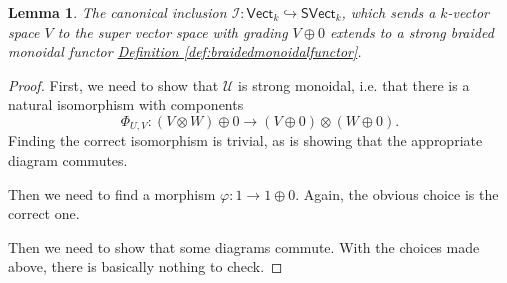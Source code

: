 \documentclass[a4paper,10pt]{scrreprt}
\theoremstyle{definition}
\theoremstyle{plain}
\newtheorem{lemma}{Lemma}[section]
\theoremstyle{remark}
\begin{document}
\begin{lemma}
  \label{lemma:monoidalinclusionofvectorspacesintosupervectorspaces}
  The canonical inclusion $\mathcal{I}\colon \mathsf{Vect}_{k} \hookrightarrow \mathsf{SVect}_{k}$, which sends a $k$-vector space $V$ to the super vector space with grading $V \oplus 0$ extends to a strong braided monoidal functor \hyperref[def:braidedmonoidalfunctor]{Definition \ref*{def:braidedmonoidalfunctor}}.
\end{lemma}
\begin{proof}
  First, we need to show that $\mathcal{U}$ is strong monoidal, i.e. that there is a natural isomorphism with components
  \begin{equation*}
    \Phi_{U,V}\colon (V \otimes W) \oplus 0 \to (V \oplus 0) \otimes (W \oplus 0).
  \end{equation*}
  Finding the correct isomorphism is trivial, as is showing that the appropriate diagram commutes.

  Then we need to find a morphism $\varphi\colon 1 \to 1 \oplus 0$. Again, the obvious choice is the correct one.

  Then we need to show that some diagrams commute. With the choices made above, there is basically nothing to check.
\end{proof}
\end{document}
